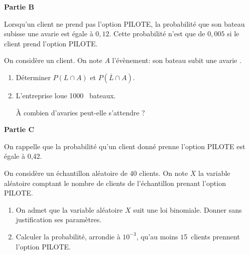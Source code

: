 \documentclass[10pt]{article}
\providecommand{\np}[2][]{{#2~#1}}
\begin{document}
\medskip

\textbf{Partie B}

\medskip
Lorsqu'un client ne prend pas l'option PILOTE, la probabilité que son bateau subisse une avarie est égale à $0,12$. Cette probabilité n'est que de $0,005$ si le client prend l'option PILOTE.

On considère un client. On note $A$ l'évènement: \og son bateau subit une avarie \fg.

\medskip

\begin{enumerate}
\item Déterminer $P(L \cap A)$ et $P\left(\overline{L} \cap A\right)$.
\item L'entreprise loue \np{1000} bateaux.

À combien d'avaries peut-elle s'attendre ?
\end{enumerate}

\medskip

\textbf{Partie C}

\medskip
On rappelle que la probabilité qu'un client donné prenne l'option PILOTE est égale à 0,42.

On considère un échantillon aléatoire de $40$ clients. On note $X$ la variable aléatoire comptant le nombre de clients de l'échantillon prenant l'option PILOTE.

\medskip

\begin{enumerate}
\item On admet que la variable aléatoire $X$ suit une loi binomiale. Donner sans justification ses paramètres.
\item Calculer la probabilité, arrondie à $10^{-3}$, qu'au moins $1$5~clients prennent l'option PILOTE.
\end{enumerate}

\bigskip
\end{document}
